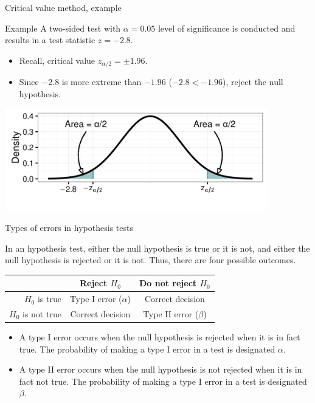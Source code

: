 \documentclass[xcolor=table]{beamer}
\begin{document}
\begin{frame}{Critical value method, example}
\begin{exampleblock}{Example}
\large
A two-sided test with $\alpha = 0.05$ level of significance is conducted and results in a test statistic $z= - 2.8$.
\begin{itemize}
\item Recall, critical value $z_{\alpha/2} = \pm 1.96$.
\item Since $-2.8$ is more extreme than $-1.96$ ($-2.8 < -1.96$), reject the null hypothesis.
\end{itemize} 
\end{exampleblock}

\medskip
{\centering
\includegraphics[width=4.5in]{../images/ch08_cv}
\par}

\end{frame}

\begin{frame}{Types of errors in hypothesis tests}
\begin{block}{}
\large
In an hypothesis test, either the null hypothesis is true or it is not, and either the null hypothesis is rejected or it is not. Thus, there are four possible outcomes.\\
\medskip
{\centering
\tabspacemed
\begin{tabular}{ r | c | c}
& Reject $H_0$ & Do not reject $H_0$\\
\hline
$H_0$ is true & Type I error ($\alpha$) & Correct decision\\
\hline
$H_0$ is not true & Correct decision & Type II error ($\beta$)
\end{tabular}
\tabspacedef
\par}
\medskip
\begin{itemize}
\pause\item A type I error occurs when the null hypothesis is rejected when it is in fact true. The probability of making a type I error in a test is designated $\alpha$.
\pause\item A type II error occurs when the null hypothesis is not rejected when it is in fact not true. The probability of making a type I error in a test is designated $\beta$.
\end{itemize}
\end{block}
\end{frame}
\end{document}
